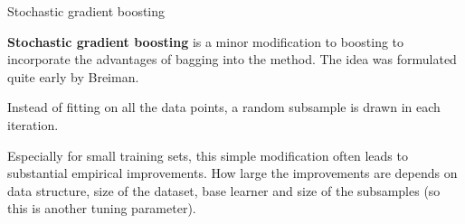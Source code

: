 \begin{vbframe}{Stochastic gradient boosting}

\textbf{Stochastic gradient boosting} is a minor modification to boosting to 
incorporate the advantages of bagging into the method.
The idea was formulated quite early by Breiman.

\lz

Instead of fitting on all the data points, a random subsample is drawn in each iteration.

\lz

Especially for small training sets, this simple modification often leads to
substantial empirical improvements.
How large the improvements are depends on data structure, size of the dataset,
base learner and size of the subsamples (so this is another tuning parameter).


\end{vbframe}















